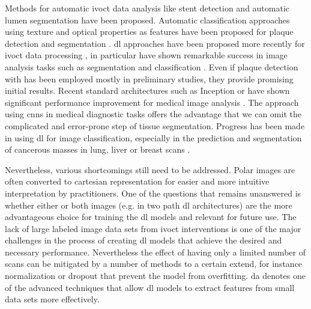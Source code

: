 Methods for automatic \acrshort{ivoct} data analysis like stent detection \cite{Zhao.2015, Lu.2012} and automatic lumen segmentation \cite{GuhaRoy.2016, Tsantis.2012} have been proposed. Automatic classification approaches using texture and optical properties as features have been proposed for plaque detection and segmentation \cite{Ughi.2013, Celi.2014}. \Acrshort{dl} approaches have been proposed more recently for \acrshort{ivoct} data processing \cite{Abdolmanafi.2017}, in particular  have shown remarkable success in image analysis tasks such as segmentation \cite{Long.2015} and classification \cite{Gessert.2018}. Even if plaque detection with  has been employed mostly in preliminary studies, they provide promising initial results. Recent standard architectures such as Inception or  have shown significant performance improvement for medical image analysis \cite{Long.2015, Gessert.2018}. The approach using \acrshort{cnn}s in medical diagnostic tasks offers the advantage that we can omit the complicated and error-prone step of tissue segmentation. Progress has been made in using \acrshort{dl} for image classification, especially in the prediction and segmentation of cancerous masses in lung, liver or breast scans \cite{Cho.2015, CruzRoa.2013, Fakoor.2013}.

Nevertheless, various shortcomings still need to be addressed. Polar images are often converted to cartesian representation for easier and more intuitive interpretation by practitioners. One of the questions that remains unanswered is whether either or both images (e.g. in two path \acrfull{dl} architectures) are the more advantageous choice for training the \acrshort{dl} models \cite{Gessert.2018} and relevant for future use. 
The lack of large labeled image data sets from \acrshort{ivoct} interventions is one of the major challenges in the process of creating \acrshort{dl} models that achieve the desired and necessary performance. Nevertheless the effect of having only a limited number of scans can be mitigated by a number of methods to a certain extend, for instance normalization or dropout that prevent the model from \gls{overfitting}. \Acrshort{da} denotes one of the advanced techniques that allow \acrshort{dl} models to extract features from small data sets more effectively.

